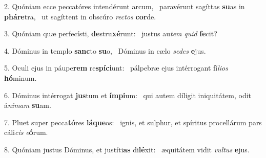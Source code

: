2. Quóniam ecce peccatóres intendérunt arcum, \dag\  paravérunt sagíttas \textbf{su}as in \textbf{phá}\textbf{re}tra, \ast\  ut sagíttent in obscúro \textit{rec}\textit{tos} \textbf{cor}de.\

3. Quóniam quæ perfecísti, \textbf{de}stru\textbf{xé}runt: \ast\  justus au\textit{tem} \textit{quid} \textbf{fe}cit?\

4. Dóminus in templo \textbf{sanc}to \textbf{su}o, \ast\  Dóminus in cælo \textit{se}\textit{des} \textbf{e}jus.\

5. Oculi ejus in páupe\textbf{rem} re\textbf{spí}\textbf{ci}unt: \ast\  pálpebræ ejus intérrogant fí\textit{li}\textit{os} \textbf{hó}minum.\

6. Dóminus intérrogat \textbf{jus}tum et \textbf{ím}\textbf{pi}um: \ast\  qui autem díligit iniquitátem, odit á\textit{ni}\textit{mam} \textbf{su}am.\

7. Pluet super pecca\textbf{tó}res \textbf{lá}\textbf{que}os: \ast\  ignis, et sulphur, et spíritus procellárum pars cáli\textit{cis} \textit{e}\textbf{ó}rum.\

8. Quóniam justus Dóminus, et justíti\textbf{as} di\textbf{lé}xit: \ast\  æquitátem vidit \textit{vul}\textit{tus} \textbf{e}jus.\

